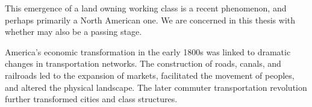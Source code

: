 This emergence of a land owning working class is a recent phenomenon, and perhaps primarily a North American one. We are concerned in this thesis with whether may also be a passing stage.

America's economic transformation in the early 1800s was linked to dramatic changes in transportation networks. The construction of roads, canals, and railroads led to the expansion of markets, facilitated the movement of peoples, and altered the physical landscape. The later commuter transportation revolution further transformed cities and class structures.

\begin{center}
\end{center}






